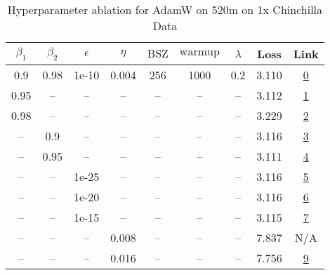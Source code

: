 \begin{table}[H]
\centering
\caption{Hyperparameter ablation for AdamW on 520m on 1x Chinchilla Data}
\label{tab:ablation_adamw_520m_1}
\begin{tabular}{ccccccccc}
\toprule
$\beta_1$ & $\beta_2$ & $\epsilon$ & $\eta$ & $\mathrm{BSZ}$ & $\mathrm{warmup}$ & $\lambda$ & Loss & Link \\
\midrule
0.9 & 0.98 & 1e-10 & 0.004 & 256 & 1000 & 0.2 & 3.110 & \href{https://wandb.ai/stanford-mercury/optimizer-scaling/runs/sweep-520m-10B-adamwf7a9c6lr0.004-wd0.2-minlr0-warmup1000-b10.9--0a09ef}{0} \\
\midrule
0.95 & -- & -- & -- & -- & -- & -- & 3.112 & \href{https://wandb.ai/stanford-mercury/optimizer-scaling/runs/sweep-520m-10B-adamw92fab3lr0.004-wd0.2-minlr0-warmup1000-b10.95-b52d40}{1} \\
0.98 & -- & -- & -- & -- & -- & -- & 3.229 & \href{https://wandb.ai/stanford-mercury/optimizer-scaling/runs/sweep-520m-10B-adamw757dfblr0.004-wd0.2-minlr0-warmup1000-b10.98-82eb00}{2} \\
-- & 0.9 & -- & -- & -- & -- & -- & 3.116 & \href{https://wandb.ai/stanford-mercury/optimizer-scaling/runs/sweep-520m-10B-adamw2399bdlr0.004-wd0.2-minlr0-warmup1000-b10.9--235c9f}{3} \\
-- & 0.95 & -- & -- & -- & -- & -- & 3.111 & \href{https://wandb.ai/stanford-mercury/optimizer-scaling/runs/sweep-520m-10B-adamw49b619lr0.004-wd0.2-minlr0-warmup1000-b10.9--0339de}{4} \\
-- & -- & 1e-25 & -- & -- & -- & -- & 3.116 & \href{https://wandb.ai/stanford-mercury/optimizer-scaling/runs/sweep-520m-10B-adamwe08492lr0.004-wd0.2-minlr0-warmup1000-b10.9--550b0a}{5} \\
-- & -- & 1e-20 & -- & -- & -- & -- & 3.116 & \href{https://wandb.ai/stanford-mercury/optimizer-scaling/runs/sweep-520m-10B-adamw920b54lr0.004-wd0.2-minlr0-warmup1000-b10.9--29bc56}{6} \\
-- & -- & 1e-15 & -- & -- & -- & -- & 3.115 & \href{https://wandb.ai/stanford-mercury/optimizer-scaling/runs/sweep-520m-10B-adamwc8444flr0.004-wd0.2-minlr0-warmup1000-b10.9--ad8761}{7} \\
-- & -- & -- & 0.008 & -- & -- & -- & 7.837 & N/A \\
-- & -- & -- & 0.016 & -- & -- & -- & 7.756 & \href{https://wandb.ai/stanford-mercury/optimizer-scaling/runs/sweep-520m-10B-adamwd13956lr0.016-wd0.2-minlr0-warmup1000-b10.9--db0248}{9} \\

\end{tabular}
\end{table}

